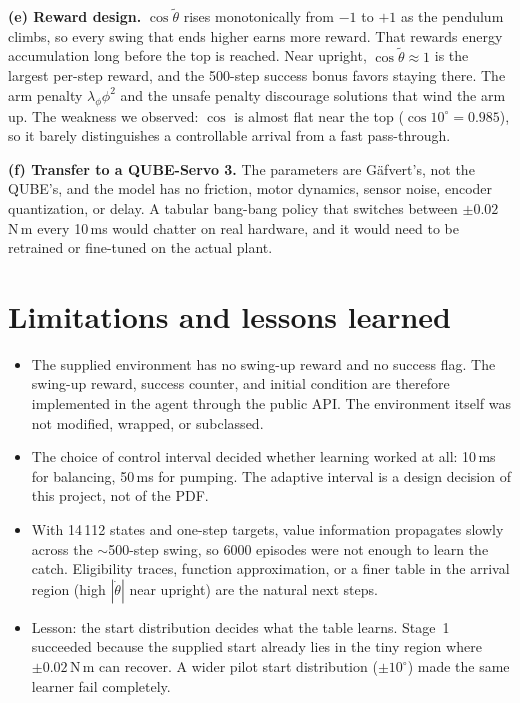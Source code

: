 \documentclass[11pt]{article}
\newcommand{\thw}{\tilde\theta}
\begin{document}
\textbf{(e) Reward design.} $\cos\thw$ rises monotonically from $-1$ to $+1$ as the pendulum
climbs, so every swing that ends higher earns more reward. That rewards energy accumulation
long before the top is reached. Near upright, $\cos\thw\approx1$ is the largest per-step reward, and
the 500-step success bonus favors staying there. The arm penalty $\lambda_\phi\phi^2$ and the unsafe
penalty discourage solutions that wind the arm up. The weakness we observed: $\cos$ is almost
flat near the top ($\cos 10^\circ=0.985$), so it barely distinguishes a controllable arrival from a
fast pass-through.

\textbf{(f) Transfer to a QUBE-Servo 3.} The parameters are G\"afvert's, not the QUBE's, and the
model has no friction, motor dynamics, sensor noise, encoder quantization, or delay. A tabular
bang-bang policy that switches between $\pm0.02$\,N\,m every 10\,ms would chatter on real hardware,
and it would need to be retrained or fine-tuned on the actual plant.

\section{Limitations and lessons learned}

\begin{itemize}
\item The supplied environment has no swing-up reward and no success flag. The swing-up reward,
success counter, and initial condition are therefore implemented in the agent through the
public API. The environment itself was not modified, wrapped, or subclassed.
\item The choice of control interval decided whether learning worked at all: 10\,ms for balancing, 50\,ms
for pumping. The adaptive interval is a design decision of this project, not of the PDF.
\item With 14\,112 states and one-step targets, value information propagates slowly across the
$\sim$500-step swing, so 6000 episodes were not enough to learn the catch. Eligibility traces,
function approximation, or a finer table in the arrival region (high $|\dot\theta|$ near upright)
are the natural next steps.
\item Lesson: the start distribution decides what the table learns. Stage~1 succeeded because
the supplied start already lies in the tiny region where $\pm0.02$\,N\,m can recover. A wider
pilot start distribution ($\pm10^\circ$) made the same learner fail completely.
\end{itemize}
\end{document}
